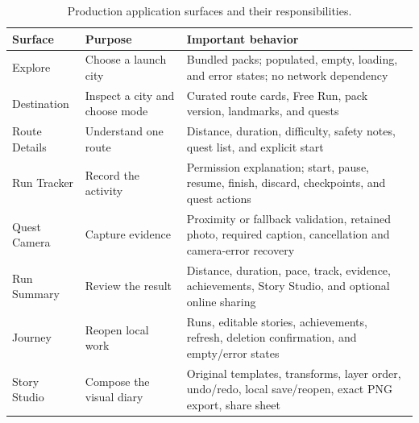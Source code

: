\begin{table}[htbp]
\centering
\small
\begin{tabularx}{\textwidth}{@{}p{31mm}X X@{}}
\toprule
\textbf{Surface} & \textbf{Purpose} & \textbf{Important behavior} \\
\midrule
Explore & Choose a launch city & Bundled packs; populated, empty, loading, and
error states; no network dependency \\
Destination & Inspect a city and choose mode & Curated route cards, Free Run,
pack version, landmarks, and quests \\
Route Details & Understand one route & Distance, duration, difficulty, safety
notes, quest list, and explicit start \\
Run Tracker & Record the activity & Permission explanation; start, pause,
resume, finish, discard, checkpoints, and quest actions \\
Quest Camera & Capture evidence & Proximity or fallback validation, retained
photo, required caption, cancellation and camera-error recovery \\
Run Summary & Review the result & Distance, duration, pace, track, evidence,
achievements, Story Studio, and optional online sharing \\
Journey & Reopen local work & Runs, editable stories, achievements, refresh,
deletion confirmation, and empty/error states \\
Story Studio & Compose the visual diary & Original templates, transforms,
layer order, undo/redo, local save/reopen, exact PNG export, share sheet \\
\bottomrule
\end{tabularx}
\caption{Production application surfaces and their responsibilities.}
\end{table}

